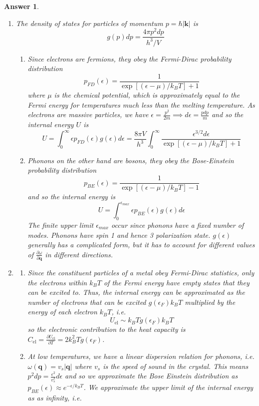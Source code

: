 \documentclass[a4paper]{article}
\newtheorem{ans}{Answer}[subsection]
\theoremstyle{new}
\begin{document}
\begin{ans}\leavevmode
\begin{enumerate}[label=(\roman*)]
\item The density of states for particles of momentum $p=\hbar|\mathbf{k}|$ is
$$g(p)dp=\frac{4\pi p^2dp}{h^3/V}$$
\begin{enumerate}[label=(\alph*)]
\item Since electrons are fermions, they obey the Fermi-Dirac probability distribution
$$p_{FD}(\epsilon)=\frac{1}{\exp[(\epsilon-\mu)/k_BT]+1}$$
where $\mu$ is the chemical potential, which is approximately equal to the Fermi energy for temperatures much less than the melting temperature. As electrons are massive particles, we have $\epsilon=\frac{p^2}{2m}\implies d\epsilon=\frac{pdp}{m}$ and so the internal energy $U$ is
$$U=\int_0^\infty\epsilon p_{FD}(\epsilon)g(\epsilon)d\epsilon=\frac{8\pi V}{h^3}\int_0^{\infty}\frac{\epsilon^{3/2}d\epsilon}{\exp[(\epsilon-\mu)/k_BT]+1}$$
\item Phonons on the other hand are bosons, they obey the Bose-Einstein probability distribution
$$p_{BE}(\epsilon)=\frac{1}{\exp[(\epsilon-\mu)/k_BT]-1}$$
and so the internal energy is 
$$U=\int_0^{\epsilon_{max}}\epsilon p_{BE}(\epsilon)g(\epsilon)d\epsilon$$
The finite upper limit $\epsilon_{max}$ occur since phonons have a fixed number of modes. Phonons have spin 1 and hence 3 polarization state. $g(\epsilon)$ generally has a complicated form, but it has to account for different values of $\frac{\partial\omega}{\partial\mathbf{q}}$ in different directions.
\end{enumerate}
\item 
\begin{enumerate}[label=(\alph*)]
\item Since the constituent particles of a metal obey Fermi-Dirac statistics, only the electrons within $k_BT$ of the Fermi energy have empty states that they can be excited to. Thus, the internal energy can be approximated as the number of electrons that can be excited $g(\epsilon_F)k_BT$ multiplied by the energy of each electron $k_BT$, i.e.
$$U_{\text{el}}\sim k_BT g(\epsilon_F)k_BT$$
so the electronic contribution to the heat capacity is $C_{\text{el}}=\frac{\partial U_{\text{el}}}{\partial T}=2k_B^2Tg(\epsilon_F)$.
\item At low temperatures, we have a linear dispersion relation for phonons, i.e. $\omega(\mathbf{q})=v_s|\mathbf{q}|$ where $v_s$ is the speed of sound in the crystal. This means $p^2dp=\frac{\epsilon^2}{v_s^3}d\epsilon$ and so we approximate the Bose Einstein distribution as $p_{BE}(\epsilon)\approx e^{-\epsilon/k_BT}$. We approximate the upper limit of the internal energy as as infinity, i.e.

\end{enumerate}
\end{enumerate}
\end{ans}
\end{document}
